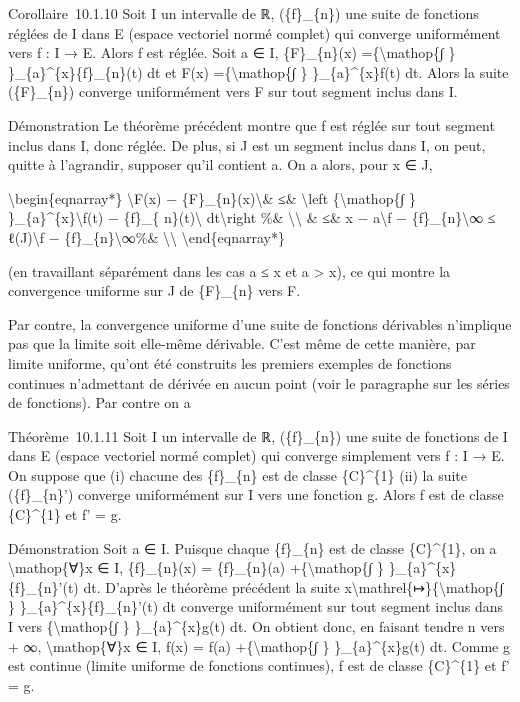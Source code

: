 \documentclass[]{article}
\begin{document}
Corollaire~10.1.10 Soit I un intervalle de ℝ, (\{f\}\_\{n\}) une suite
de fonctions réglées de I dans E (espace vectoriel normé complet) qui
converge uniformément vers f : I → E. Alors f est réglée. Soit a ∈ I,
\{F\}\_\{n\}(x) =\{\textbackslash{}mathop\{∫ \}
\}\_\{a\}\^{}\{x\}\{f\}\_\{n\}(t) dt et F(x)
=\{\textbackslash{}mathop\{∫ \} \}\_\{a\}\^{}\{x\}f(t) dt. Alors la
suite (\{F\}\_\{n\}) converge uniformément vers F sur tout segment
inclus dans I.

Démonstration Le théorème précédent montre que f est réglée sur tout
segment inclus dans I, donc réglée. De plus, si J est un segment inclus
dans I, on peut, quitte à l'agrandir, supposer qu'il contient a. On a
alors, pour x ∈ J,

\textbackslash{}begin\{eqnarray*\} \textbackslash{}\textbar{}F(x) −
\{F\}\_\{n\}(x)\textbackslash{}\textbar{}\& ≤\& \textbackslash{}left
\textbar{}\{\textbackslash{}mathop\{∫ \}
\}\_\{a\}\^{}\{x\}\textbackslash{}\textbar{}f(t) − \{f\}\_\{
n\}(t)\textbackslash{}\textbar{} dt\textbackslash{}right \textbar{} \%\&
\textbackslash{}\textbackslash{} \& ≤\& \textbar{}x −
a\textbar{}\textbackslash{}\textbar{}f −
\{f\}\_\{n\}\textbackslash{}\textbar{}∞ ≤
ℓ(J)\textbackslash{}\textbar{}f −
\{f\}\_\{n\}\textbackslash{}\textbar{}∞\%\&
\textbackslash{}\textbackslash{} \textbackslash{}end\{eqnarray*\}

(en travaillant séparément dans les cas a ≤ x et a \textgreater{} x), ce
qui montre la convergence uniforme sur J de \{F\}\_\{n\} vers F.

Par contre, la convergence uniforme d'une suite de fonctions dérivables
n'implique pas que la limite soit elle-même dérivable. C'est même de
cette manière, par limite uniforme, qu'ont été construits les premiers
exemples de fonctions continues n'admettant de dérivée en aucun point
(voir le paragraphe sur les séries de fonctions). Par contre on a

Théorème~10.1.11 Soit I un intervalle de ℝ, (\{f\}\_\{n\}) une suite de
fonctions de I dans E (espace vectoriel normé complet) qui converge
simplement vers f : I → E. On suppose que (i) chacune des \{f\}\_\{n\}
est de classe \{C\}\^{}\{1\} (ii) la suite (\{f\}\_\{n\}') converge
uniformément sur I vers une fonction g. Alors f est de classe
\{C\}\^{}\{1\} et f' = g.

Démonstration Soit a ∈ I. Puisque chaque \{f\}\_\{n\} est de classe
\{C\}\^{}\{1\}, on a \textbackslash{}mathop\{∀\}x ∈ I, \{f\}\_\{n\}(x) =
\{f\}\_\{n\}(a) +\{\textbackslash{}mathop\{∫ \}
\}\_\{a\}\^{}\{x\}\{f\}\_\{n\}'(t) dt. D'après le théorème précédent la
suite x\textbackslash{}mathrel\{↦\}\{\textbackslash{}mathop\{∫ \}
\}\_\{a\}\^{}\{x\}\{f\}\_\{n\}'(t) dt converge uniformément sur tout
segment inclus dans I vers \{\textbackslash{}mathop\{∫ \}
\}\_\{a\}\^{}\{x\}g(t) dt. On obtient donc, en faisant tendre n vers +
∞, \textbackslash{}mathop\{∀\}x ∈ I, f(x) = f(a)
+\{\textbackslash{}mathop\{∫ \} \}\_\{a\}\^{}\{x\}g(t) dt. Comme g est
continue (limite uniforme de fonctions continues), f est de classe
\{C\}\^{}\{1\} et f' = g.
\end{document}
